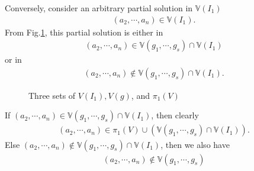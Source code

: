 \documentclass[11pt]{book}
\begin{document}
Conversely, consider an arbitrary partial solution in $\mathbb{V}(I_1)$
\begin{eqnarray}
(a_2, \cdots, a_n) \in \mathbb{V}(I_1).
\end{eqnarray}
From Fig.\ref{vennDiagram1}, this partial solution is either in
\begin{eqnarray}
(a_2, \cdots, a_n) \in \mathbb{V}(g_1, \cdots, g_s) \cap \mathbb{V}(I_1)
\end{eqnarray}
or in
\begin{eqnarray}
(a_2, \cdots, a_n) \notin \mathbb{V}(g_1, \cdots, g_s) \cap \mathbb{V}(I_1).
\end{eqnarray}
\begin{figure}[htbp]
\begin{center}

\def\firstcircle{(90:1.75cm) circle (2.5cm)}
\def\secondcircle{(210:1.75cm) circle (2.5cm)}
\def\thirdcircle{(330:1.75cm) circle (2.5cm)}


\caption{Three sets of $V(I_1), V(g)$, and $\pi_1(V)$}
\label{vennDiagram1}
\end{center}
\end{figure}
If $(a_2, \cdots, a_n) \in \mathbb{V}(g_1, \cdots, g_s) \cap \mathbb{V}(I_1)$, then clearly
\begin{eqnarray}
(a_2, \cdots, a_n) \in \pi_1(V) \cup \left( \mathbb{V}(g_1, \cdots, g_s) \cap \mathbb{V}(I_1) \right).
\end{eqnarray}
Else $(a_2, \cdots, a_n) \notin \mathbb{V}(g_1, \cdots, g_s) \cap \mathbb{V}(I_1)$, then we also have
\begin{eqnarray}
(a_2, \cdots, a_n) \notin \mathbb{V}(g_1, \cdots, g_s)
\end{eqnarray}
\end{document}
